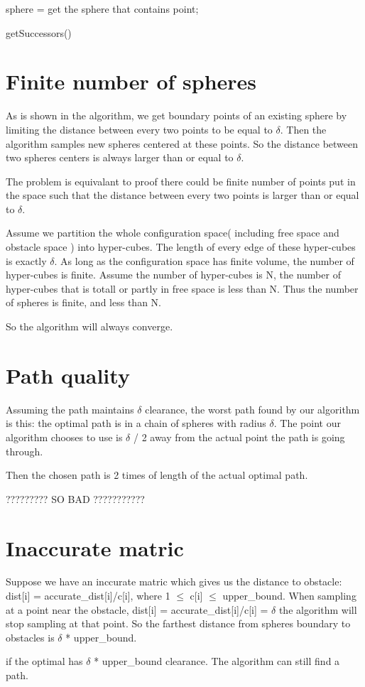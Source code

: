 \documentclass[11pt]{article}
\begin{document}
 
 

 \begin{algorithm}
 	sphere = get the sphere that contains point; \\
 \caption{ getSuccessors()\label{IR} }
 \end{algorithm}



 \section{Finite number of spheres}
 \label{Finite number of spheres}
 As is shown in the algorithm, we get boundary points of an existing sphere by limiting the distance between every two points to be equal to $\delta$. Then the algorithm samples new spheres centered at these points. So the distance between two spheres centers is always larger than or equal to $\delta$. 

 The problem is equivalant to proof there could be finite number of points put in the space such that the distance between every two points is larger than or equal to $\delta$.

 Assume we partition the whole configuration space( including free space and obstacle space ) into hyper-cubes. The length of every edge of these hyper-cubes is exactly $\delta$. As long as the configuration space has finite volume, the number of hyper-cubes is finite. Assume the number of hyper-cubes is N, the number of hyper-cubes that is totall or partly in free space is less than N. Thus the number of spheres is finite, and less than N.

 So the algorithm will always converge.

 \section{Path quality}
 \label{Path quality}
 Assuming the path maintains $\delta$ clearance, the worst path found by our algorithm is this: the optimal path is in a chain of spheres with radius $\delta$. The point our algorithm chooses to use is $\delta$ / 2 away from the actual point the path is going through.

 Then the chosen path is 2 times of length of the actual optimal path. 

 ????????? SO BAD ???????????

 \section{Inaccurate matric}
 \label{Inaccurate matric}
 Suppose we have an inccurate matric which gives us the distance to obstacle:
 dist[i] = accurate\_dist[i]/c[i], where 1 $\leq$ c[i] $\leq$ upper\_bound. When sampling at a point near the obstacle, dist[i] = accurate\_dist[i]/c[i] = $\delta$ the algorithm will stop sampling at that point. So the farthest distance from spheres boundary to obstacles is $\delta$ * upper\_bound. 

 if the optimal has $\delta$ * upper\_bound clearance. The algorithm can still find a path.

 
\end{document}

